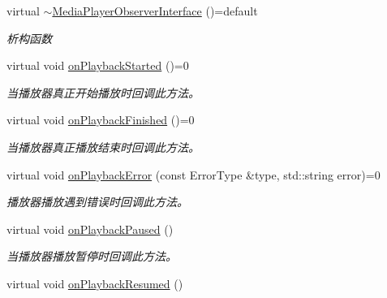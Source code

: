 \begin{DoxyCompactItemize}
\item 
\mbox{\label{classduerOSDcsSDK_1_1sdkInterfaces_1_1MediaPlayerObserverInterface_ae2ead9476d1259d8af4b930dd753f542}} 
virtual \hyperlink{classduerOSDcsSDK_1_1sdkInterfaces_1_1MediaPlayerObserverInterface_ae2ead9476d1259d8af4b930dd753f542}{$\sim$\+Media\+Player\+Observer\+Interface} ()=default
\begin{DoxyCompactList}\small\item\em 析构函数 \end{DoxyCompactList}\item 
virtual void \hyperlink{classduerOSDcsSDK_1_1sdkInterfaces_1_1MediaPlayerObserverInterface_a937a26a85f0be08cca2887aac1b504e5}{on\+Playback\+Started} ()=0
\begin{DoxyCompactList}\small\item\em 当播放器真正开始播放时回调此方法。 \end{DoxyCompactList}\item 
virtual void \hyperlink{classduerOSDcsSDK_1_1sdkInterfaces_1_1MediaPlayerObserverInterface_a91a0d0a61da7e59ee2a5206046bd7206}{on\+Playback\+Finished} ()=0
\begin{DoxyCompactList}\small\item\em 当播放器真正播放结束时回调此方法。 \end{DoxyCompactList}\item 
virtual void \hyperlink{classduerOSDcsSDK_1_1sdkInterfaces_1_1MediaPlayerObserverInterface_a38aa45e3f2e3f125f6713e26c1bda5f4}{on\+Playback\+Error} (const Error\+Type \&type, std\+::string error)=0
\begin{DoxyCompactList}\small\item\em 播放器播放遇到错误时回调此方法。 \end{DoxyCompactList}\item 
virtual void \hyperlink{classduerOSDcsSDK_1_1sdkInterfaces_1_1MediaPlayerObserverInterface_ae209d280fa356a0beefc5719ee60d283}{on\+Playback\+Paused} ()
\begin{DoxyCompactList}\small\item\em 当播放器播放暂停时回调此方法。 \end{DoxyCompactList}\item 
virtual void \hyperlink{classduerOSDcsSDK_1_1sdkInterfaces_1_1MediaPlayerObserverInterface_a45a55d1c8017d1f727a4b44c91b5946a}{on\+Playback\+Resumed} ()

\end{DoxyCompactItemize}
